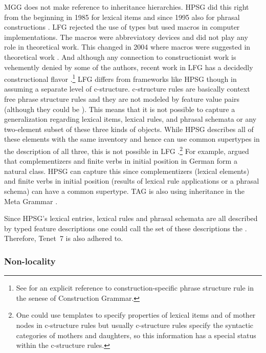 \documentclass[output=paper]{langsci/langscibook}
\begin{document}
MGG does not make reference to inheritance hierarchies. HPSG did this right from the beginning in 1985 \citep{FPW85a} for lexical items and
since 1995 also for phrasal constructions \citep{Sag97a}. LFG rejected the use of types but used
macros in computer implementations. The macros were abbreviatory devices and did not play any role in
theoretical work. This changed in 2004 where macros were suggested in theoretical work
\citep*{DKK2004a}. And although any connection to constructionist work is vehemently denied by some
of the authors, recent work in LFG has a decidedly constructional flavor
\citep*{ADT2008a,AGT2014a}.\footnote{
  See  for an explicit reference to construction-specific phrase
  structure rule in the senese of Construction Grammar.
}
LFG differs from frameworks like HPSG though in assuming a separate level of
c-structure. c-structure rules are basically context free phrase structure rules and they are not
modeled by feature value pairs (although they could be \citep{Kaplan95a}). This means that it is not
possible to capture a generalization regarding lexical items, lexical rules, and phrasal
schemata or any two-element subset of these three kinds of objects. While HPSG describes all of
these elements with the same inventory and hence can use common supertypes in the description of all
three, this is not possible in LFG \citep[Section~23.1]{MuellerGT-Eng2}.\footnote{
  One could use templates \citep{DKK2004a,ADT2013a} to specify properties of lexical items and of mother nodes in c-structure
  rules but usually c-structure rules specify the syntactic categories of mothers and daughters, so
  this information has a special status within the c-structure rules.
} For example, \citet{Hoehle97a} argued that
complementizers and finite verbs in initial position in German form a natural class. HPSG can
capture this since complementizers (lexical elements) and finite verbs in initial position (results
of lexical rule applications or a phrasal schema) can have a common supertype.
TAG is also using inheritance in the Meta Grammar \citep{LK2017a}.

Since HPSG's lexical entries, lexical rules and phrasal schemata are all described by typed feature
descriptions one could call the set of these descriptions the . Therefore,
Tenet~7 is also adhered to. 

\subsubsection{Non-locality}
\label{sec-locality}
\end{document}

